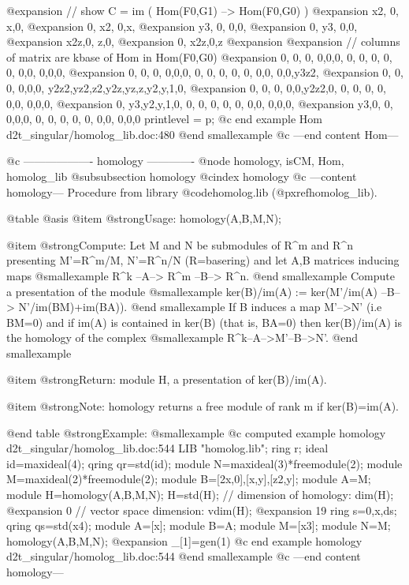@expansion{} // show C = im ( Hom(F0,G1) --> Hom(F0,G0) )
@expansion{} x2, 0,  x,0,
@expansion{} 0,  x2, 0,x,
@expansion{} y3, 0,  0,0,
@expansion{} 0,  y3, 0,0,
@expansion{} x2z,0,  z,0,
@expansion{} 0,  x2z,0,z 
@expansion{} 
@expansion{} // columns of matrix are kbase of Hom in Hom(F0,G0)
@expansion{} 0, 0, 0, 0,0,0,   0,   0,  0, 0,  0, 0,0, 0,0,0,   
@expansion{} 0, 0, 0, 0,0,0,   0,   0,  0, 0,  0, 0,0, 0,0,y3z2,
@expansion{} 0, 0, 0, 0,0,0,   y2z2,yz2,z2,y2z,yz,z,y2,y,1,0,   
@expansion{} 0, 0, 0, 0,0,y2z2,0,   0,  0, 0,  0, 0,0, 0,0,0,   
@expansion{} 0, y3,y2,y,1,0,   0,   0,  0, 0,  0, 0,0, 0,0,0,   
@expansion{} y3,0, 0, 0,0,0,   0,   0,  0, 0,  0, 0,0, 0,0,0    
printlevel = p;
@c end example Hom d2t_singular/homolog_lib.doc:480
@end smallexample
@c ---end content Hom---

@c ------------------- homology -------------
@node homology, isCM, Hom, homolog_lib
@subsubsection homology
@cindex homology
@c ---content homology---
Procedure from library @code{homolog.lib} (@pxref{homolog_lib}).

@table @asis
@item @strong{Usage:}
homology(A,B,M,N);

@item @strong{Compute:}
Let M and N be submodules of R^m and R^n presenting M'=R^m/M, N'=R^n/N
(R=basering) and let A,B matrices inducing maps
@smallexample
    R^k --A--> R^m --B--> R^n.
@end smallexample
Compute a presentation of the module
@smallexample
    ker(B)/im(A) := ker(M'/im(A) --B--> N'/im(BM)+im(BA)).
@end smallexample
If B induces a map M'-->N' (i.e BM=0) and if im(A) is contained in
ker(B) (that is, BA=0) then ker(B)/im(A) is the homology of the
complex
@smallexample
    R^k--A-->M'--B-->N'. 
@end smallexample

@item @strong{Return:}
module H, a presentation of ker(B)/im(A).

@item @strong{Note:}
homology returns a free module of rank m if ker(B)=im(A).

@end table
@strong{Example:}
@smallexample
@c computed example homology d2t_singular/homolog_lib.doc:544 
LIB "homolog.lib";
ring r;
ideal id=maxideal(4);
qring qr=std(id);
module N=maxideal(3)*freemodule(2);
module M=maxideal(2)*freemodule(2);
module B=[2x,0],[x,y],[z2,y];
module A=M;
module H=homology(A,B,M,N);
H=std(H);
// dimension of homology:
dim(H);
@expansion{} 0
// vector space dimension: 
vdim(H);
@expansion{} 19
ring s=0,x,ds;
qring qs=std(x4);
module A=[x];
module B=A;
module M=[x3];
module N=M;
homology(A,B,M,N);
@expansion{} _[1]=gen(1)
@c end example homology d2t_singular/homolog_lib.doc:544
@end smallexample
@c ---end content homology---

